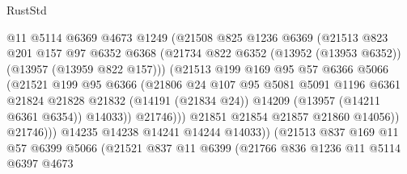 \begin{lexlean}{RustStd}
\begin{coremodule}
                          @11
                          @5114
                          @6369
                          @4673
                          @1249
                          (@21508
                            @825
                            @1236
                            @6369
                            (@21513
                              @823
                              @201
                              @157
                              @97
                              @6352
                              @6368
                              (@21734
                                @822
                                @6352
                                (@13952 (@13953 @6352))
                                (@13957 (@13959 @822 @157)))
                              (@21513
                                @199
                                @169
                                @95
                                @57
                                @6366
                                @5066
                                (@21521
                                  @199
                                  @95
                                  @6366
                                  (@21806
                                    @24
                                    @107
                                    @95
                                    @5081
                                    @5091
                                    @1196
                                    @6361
                                    @21824
                                    @21828
                                    @21832
                                    (@14191 (@21834 @24))
                                    @14209
                                    (@13957 (@14211 @6361 @6354))
                                    @14033))
                                @21746)))
                          @21851
                          @21854
                          @21857
                          @21860
                          @14056))
                      @21746)))
                @14235
                @14238
                @14241
                @14244
                @14033))
            (@21513
              @837
              @169
              @11
              @57
              @6399
              @5066
              (@21521
                @837
                @11
                @6399
                (@21766
                  @836
                  @1236
                  @11
                  @5114
                  @6397
                  @4673

\end{coremodule}
\end{lexlean}
